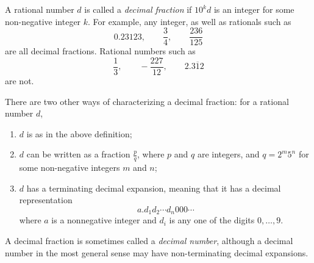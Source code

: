 \documentclass[12pt]{article}
\begin{document}
A rational number $d$ is called a \emph{decimal fraction} if $10^kd$ is an integer for some non-negative integer $k$.  For example, any integer, as well as rationals such as 
$$0.23123,\qquad \frac{3}{4},\qquad \frac{236}{125}$$
are all decimal fractions.  Rational numbers such as $$\frac{1}{3},\qquad -\frac{227}{12}, \qquad 2.\overline{312}$$ are not.

There are two other ways of characterizing a decimal fraction: for a rational number $d$,
\begin{enumerate}
\item $d$ is as in the above definition;
\item $d$ can be written as a fraction $\displaystyle{\frac{p}{q}}$, where $p$ and $q$ are integers, and $q=2^m5^n$ for some non-negative integers $m$ and $n$;
\item $d$ has a terminating decimal expansion, meaning that it has a decimal representation $$a.d_1d_2\cdots d_n000\cdots$$
where $a$ is a nonnegative integer and $d_i$ is any one of the digits $0,\ldots,9$.
\end{enumerate}

A decimal fraction is sometimes called a \emph{decimal number}, although a decimal number in the most general sense may have non-terminating decimal expansions.
\end{document}
